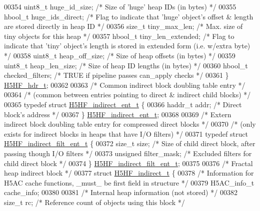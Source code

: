 \begin{DoxyCode}
00354     uint8\_t     huge\_id\_size;   \textcolor{comment}{/* Size of 'huge' heap IDs (in bytes) */}
00355     hbool\_t     huge\_ids\_direct; \textcolor{comment}{/* Flag to indicate that 'huge' object's offset & length are stored
       directly in heap ID */}
00356     \textcolor{keywordtype}{size\_t}      tiny\_max\_len;   \textcolor{comment}{/* Max. size of tiny objects for this heap */}
00357     hbool\_t     tiny\_len\_extended; \textcolor{comment}{/* Flag to indicate that 'tiny' object's length is stored in extended
       form (i.e. w/extra byte) */}
00358     uint8\_t     heap\_off\_size;  \textcolor{comment}{/* Size of heap offsets (in bytes) */}
00359     uint8\_t     heap\_len\_size;  \textcolor{comment}{/* Size of heap ID lengths (in bytes) */}
00360     hbool\_t     checked\_filters; \textcolor{comment}{/* TRUE if pipeline passes can\_apply checks */}
00361 \} \hyperlink{struct_h5_h_f__hdr__t}{H5HF\_hdr\_t};
00362 
00363 \textcolor{comment}{/* Common indirect block doubling table entry */}
00364 \textcolor{comment}{/* (common between entries pointing to direct & indirect child blocks) */}
00365 \textcolor{keyword}{typedef} \textcolor{keyword}{struct }\hyperlink{struct_h5_h_f__indirect__ent__t}{H5HF\_indirect\_ent\_t} \{
00366     haddr\_t     addr;           \textcolor{comment}{/* Direct block's address                     */}
00367 \} \hyperlink{struct_h5_h_f__indirect__ent__t}{H5HF\_indirect\_ent\_t};
00368 
00369 \textcolor{comment}{/* Extern indirect block doubling table entry for compressed direct blocks */}
00370 \textcolor{comment}{/* (only exists for indirect blocks in heaps that have I/O filters) */}
00371 \textcolor{keyword}{typedef} \textcolor{keyword}{struct }\hyperlink{struct_h5_h_f__indirect__filt__ent__t}{H5HF\_indirect\_filt\_ent\_t} \{
00372     \textcolor{keywordtype}{size\_t}     size;            \textcolor{comment}{/* Size of child direct block, after passing though I/O filters */}
00373     \textcolor{keywordtype}{unsigned}    filter\_mask;    \textcolor{comment}{/* Excluded filters for child direct block */}
00374 \} \hyperlink{struct_h5_h_f__indirect__filt__ent__t}{H5HF\_indirect\_filt\_ent\_t};
00375 
00376 \textcolor{comment}{/* Fractal heap indirect block */}
00377 \textcolor{keyword}{struct }\hyperlink{struct_h5_h_f__indirect__t}{H5HF\_indirect\_t} \{
00378     \textcolor{comment}{/* Information for H5AC cache functions, \_must\_ be first field in structure */}
00379     H5AC\_info\_t cache\_info;
00380 
00381     \textcolor{comment}{/* Internal heap information (not stored) */}
00382     \textcolor{keywordtype}{size\_t}      rc;             \textcolor{comment}{/* Reference count of objects using this block */}

\end{DoxyCode}
